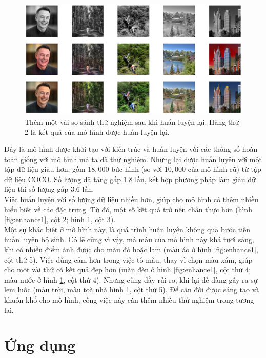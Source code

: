 \documentclass[a4paper, 12pt]{article}
\begin{document}
\begin{figure}[!h]
\captionsetup{width=0.8\textwidth}
\centering
\includegraphics[width=15cm]{images/enhance2.png}
\caption{Thêm một vài so sánh thử nghiệm sau khi huấn luyện lại. Hàng thứ 2 là kết quả của mô hình được huấn luyện lại.}
\label{fig:enhance2}
\end{figure}

\noindent
Đây là mô hình được khởi tạo với kiến trúc và huấn luyện với các thông số hoàn toàn giống với mô hình mà ta đã thử nghiệm. Nhưng lại được huấn luyện với một tập dữ liệu giàu hơn, gồm $18,000$ bức hình (so với $10,000$ của mô hình cũ) từ tập dữ liệu COCO. Số lượng đã tăng gấp 1.8 lần, kết hợp phương pháp làm giàu dữ liệu thì số lượng gấp 3.6 lần.\vspace{5pt}\\
Việc huấn luyện với số lượng dữ liệu nhiều hơn, giúp cho mô hình có thêm nhiều hiểu biết về các đặc trưng. Từ đó, một số kết quả trở nên chân thực hơn (hình \ref{fig:enhance1}, cột 2; hình \ref{fig:enhance2}, cột 3).\vspace{5pt}\\
Một sự khác biệt ở mô hình này, là quá trình huấn luyện không qua bước tiền huấn luyện bộ sinh. Có lẽ cũng vì vậy, mà màu của mô hình này khá tươi sáng, khi có nhiều điểm ảnh được cho màu đỏ hoặc lam (màu áo ở hình \ref{fig:enhance1}, cột thứ 5). Việc dũng cảm hơn trong việc tô màu, thay vì chọn màu xám, giúp cho một vài thứ có kết quả đẹp hơn (màu đèn ở hình \ref{fig:enhance1}, cột thứ 4; màu nước ở hình \ref{fig:enhance2}, cột thứ 4). Nhưng cũng đầy rủi ro, khi lại dễ dàng gây ra sự lem luốc (màu trời, màu toà nhà hình \ref{fig:enhance2}, cột thứ 5). Để cân đối được sáng tạo và khuôn khổ cho mô hình, công việc này cần thêm nhiều thử nghiệm trong tương lai.

\section{Ứng dụng}
\end{document}
